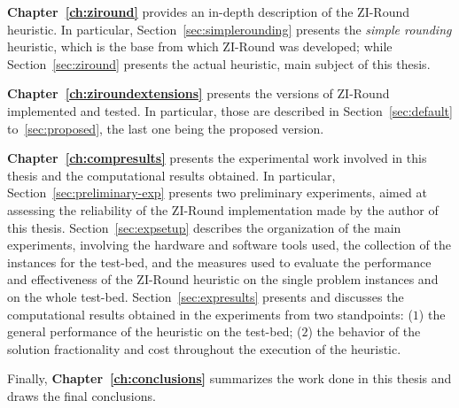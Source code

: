 \documentclass[a4paper,12pt,twoside]{scrbook}
\begin{document}
\textbf{Chapter~\ref{ch:ziround}} provides an in-depth description of the ZI-Round heuristic. In particular, Section~\ref{sec:simplerounding} presents the \textit{simple rounding} heuristic, which is the base from which ZI-Round was developed; while Section~\ref{sec:ziround} presents the actual heuristic, main subject of this thesis. \vspace{0.2cm} \par 
\textbf{Chapter~\ref{ch:ziroundextensions}} presents the versions of ZI-Round implemented and tested. In particular, those are described in Section~\ref{sec:default} to~\ref{sec:proposed}, the last one being the proposed version. \vspace{0.2cm} \par 
\textbf{Chapter~\ref{ch:compresults}} presents the experimental work involved in this thesis and the computational results obtained. In particular, Section~\ref{sec:preliminary-exp} presents two preliminary experiments, aimed at assessing the reliability of the ZI-Round implementation made by the author of this thesis. Section~\ref{sec:expsetup} describes the organization of the main experiments, involving the hardware and software tools used, the collection of the instances for the test-bed, and the measures used to evaluate the performance and effectiveness of the ZI-Round heuristic on the single problem instances and on the whole test-bed. Section~\ref{sec:expresults} presents and discusses the computational results obtained in the experiments from two standpoints: ($1$) the general performance of the heuristic on the test-bed; ($2$) the behavior of the solution fractionality and cost throughout the execution of the heuristic. \vspace{0.2cm} \par 
Finally, \textbf{Chapter~\ref{ch:conclusions}} summarizes the work done in this thesis and draws the final conclusions.
\end{document}

